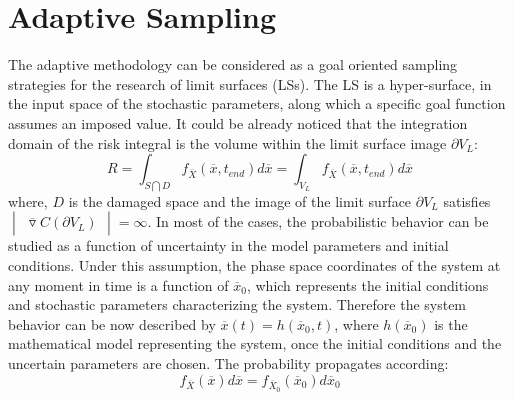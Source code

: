 \documentclass{anstrans}
\begin{document}
\section{Adaptive Sampling}
The  adaptive methodology can be considered as a goal oriented sampling strategies for the research of limit surfaces (LSs). The LS is a hyper-surface, in the input space of the stochastic parameters, along which a specific goal function assumes an imposed value. 
It could be already noticed that the integration domain of the risk integral is the volume within the limit surface image $\partial V_{L}$:
\begin{equation} 
R=\int_{S\bigcap D} f _{\overline{X}}(\overline{x},t_{end})d\overline{x} =\int_{V_{L}}    f _{\overline{X}}(\overline{x},t_{end})d\overline{x}
\end{equation}
where, $D$ is the damaged space and the image of the limit surface $\partial V_{L}$ satisfies $\begin{vmatrix} \overline{\triangledown} C\left ( \partial V_{L} \right ) \end{vmatrix} = \infty $.
In most of the cases\cite{MathFrameworkMC2013}, the probabilistic behavior can be studied as a function of uncertainty in the model parameters and initial conditions.
Under this assumption, the phase space coordinates of the system at any moment in time is a function of $\overline{x}_{0}$, which represents the initial conditions and stochastic parameters characterizing the system. Therefore the system behavior can be now described by $\overline{x}(t)=h(\overline{x}_{0},t)$, where $h(\overline{x}_{0})$ is the mathematical model representing the system, once the initial conditions and the uncertain parameters are chosen. The probability propagates according:
\begin{equation} 
f _{\overline{X}}(\overline{x})d\overline{x} = f _{\overline{X}_{0}}(\overline{x}_{0})d\overline{x}_{0}
\end{equation}
\end{document}
